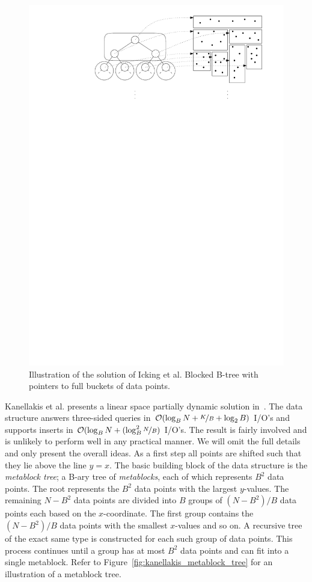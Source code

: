 \documentclass[twoside,11pt,openright]{report}
\begin{document}
\begin{figure}[h]
	\centering
		\includegraphics[width=\textwidth]{../figures/icking_external_pst}
	\caption{Illustration of the solution of Icking et al. Blocked B-tree with pointers to full buckets of data points.}
	\label{fig:icking_external_pst}
\end{figure}

Kanellakis et al. presents a linear space partially dynamic solution in~\cite{Kanellakis1996589}. The data structure answers three-sided queries in $\mathcal{O}(\log_B N + \nicefrac{K}{B} + \log_2 B)$ I/O's and supports inserts in $\mathcal{O}(\log_B N + (\log^2_B \nicefrac{N}{B})$ I/O's. The result is fairly involved and is unlikely to perform well in any practical manner. We will omit the full details and only present the overall ideas. As a first step all points are shifted such that they lie above the line $y = x$. The basic building block of the data structure is the \textit{metablock tree}; a B-ary tree of \textit{metablocks}, each of which represents $B^2$ data points. The root represents the $B^2$ data points with the largest $y$-values. The remaining $N - B^2$ data points are divided into $B$ groups of $(N - B^2)/B$ data points each based on the $x$-coordinate. The first group contains the $(N - B^2)/B$ data points with the smallest $x$-values and so on. A recursive tree of the exact same type is constructed for each such group of data points. This process continues until a group has at most $B^2$ data points and can fit into a single metablock. Refer to Figure~\ref{fig:kanellakis_metablock_tree} for an illustration of a metablock tree.
\end{document}
